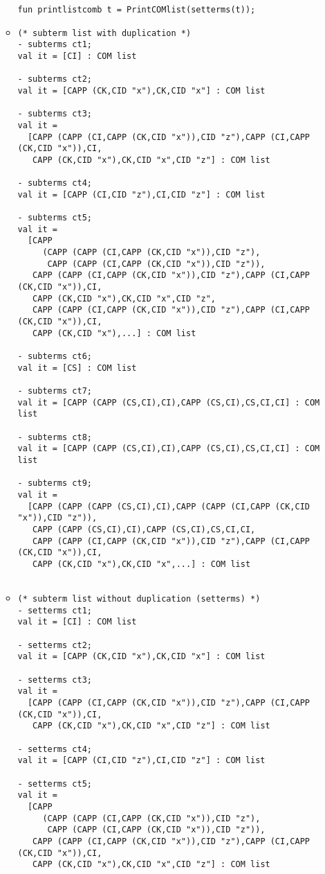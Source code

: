 \documentclass[11pt]{article}
\begin{document}
\begin{enumerate}
\begin{itemize}
\begin{verbatim}
fun printlistcomb t = PrintCOMlist(setterms(t));
	      	      \end{verbatim}
	      	\item
	      	      \begin{verbatim}
(* subterm list with duplication *)
- subterms ct1;
val it = [CI] : COM list

- subterms ct2;
val it = [CAPP (CK,CID "x"),CK,CID "x"] : COM list

- subterms ct3;
val it =
  [CAPP (CAPP (CI,CAPP (CK,CID "x")),CID "z"),CAPP (CI,CAPP (CK,CID "x")),CI,
   CAPP (CK,CID "x"),CK,CID "x",CID "z"] : COM list
   
- subterms ct4;
val it = [CAPP (CI,CID "z"),CI,CID "z"] : COM list

- subterms ct5;
val it =
  [CAPP
     (CAPP (CAPP (CI,CAPP (CK,CID "x")),CID "z"),
      CAPP (CAPP (CI,CAPP (CK,CID "x")),CID "z")),
   CAPP (CAPP (CI,CAPP (CK,CID "x")),CID "z"),CAPP (CI,CAPP (CK,CID "x")),CI,
   CAPP (CK,CID "x"),CK,CID "x",CID "z",
   CAPP (CAPP (CI,CAPP (CK,CID "x")),CID "z"),CAPP (CI,CAPP (CK,CID "x")),CI,
   CAPP (CK,CID "x"),...] : COM list
   
- subterms ct6;
val it = [CS] : COM list

- subterms ct7;
val it = [CAPP (CAPP (CS,CI),CI),CAPP (CS,CI),CS,CI,CI] : COM list

- subterms ct8;
val it = [CAPP (CAPP (CS,CI),CI),CAPP (CS,CI),CS,CI,CI] : COM list

- subterms ct9;
val it =
  [CAPP (CAPP (CAPP (CS,CI),CI),CAPP (CAPP (CI,CAPP (CK,CID "x")),CID "z")),
   CAPP (CAPP (CS,CI),CI),CAPP (CS,CI),CS,CI,CI,
   CAPP (CAPP (CI,CAPP (CK,CID "x")),CID "z"),CAPP (CI,CAPP (CK,CID "x")),CI,
   CAPP (CK,CID "x"),CK,CID "x",...] : COM list
   
   \end{verbatim}
   \item
   \begin{verbatim}
(* subterm list without duplication (setterms) *)
- setterms ct1;
val it = [CI] : COM list

- setterms ct2;
val it = [CAPP (CK,CID "x"),CK,CID "x"] : COM list

- setterms ct3;
val it =
  [CAPP (CAPP (CI,CAPP (CK,CID "x")),CID "z"),CAPP (CI,CAPP (CK,CID "x")),CI,
   CAPP (CK,CID "x"),CK,CID "x",CID "z"] : COM list
   
- setterms ct4;
val it = [CAPP (CI,CID "z"),CI,CID "z"] : COM list

- setterms ct5;
val it =
  [CAPP
     (CAPP (CAPP (CI,CAPP (CK,CID "x")),CID "z"),
      CAPP (CAPP (CI,CAPP (CK,CID "x")),CID "z")),
   CAPP (CAPP (CI,CAPP (CK,CID "x")),CID "z"),CAPP (CI,CAPP (CK,CID "x")),CI,
   CAPP (CK,CID "x"),CK,CID "x",CID "z"] : COM list
   

\end{verbatim}
\end{itemize}
\end{enumerate}
\end{document}
